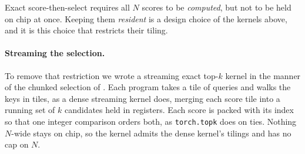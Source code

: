 Exact score-then-select requires all $N$ scores to be \emph{computed}, but not
to be held on chip at once. Keeping them \emph{resident} is a design choice of
the kernels above, and it is this choice that restricts their tiling.

\begin{table}[t]
\centering\small
\caption{A streaming exact top-$k$ kernel, which walks the keys in tiles and
keeps a running candidate set per query instead of the score row: latency
divided by the best dense implementation (ratios of minima under CUDA-graph
replay, fp32, batch $256$), beside the resident-row kernel at four retained
peers. The streaming kernel retains exactly the peers \texttt{torch.topk} does
in every one of
\StreamRowsM{} million query rows checked. The last column is the share of the
streaming kernel's time not accounted for by attending over the set, across
$k$, as in Table~\ref{tab:fixedset}. Rows at $1024$ agents are beyond the
resident kernels' cap. The median of the per-repetition paired ratios is within
$13\%$ of the ratio of minima, with a $95\%$ bootstrap interval within
$\pm3.7\%$, and every one- and two-peer entry is below one under either
statistic.}
\label{tab:streaming}

\end{table}

\paragraph{Streaming the selection.} To remove that restriction we wrote a
streaming exact top-$k$ kernel in the manner of the chunked selection of
\citet{gupta2021topk}. Each program takes a tile of queries and walks the keys
in tiles, as a dense streaming kernel does, merging each score tile into a
running set of $k$ candidates held in registers. Each score is packed with its
index so that one integer comparison orders both, as \texttt{torch.topk} does on
ties. Nothing $N$-wide stays on chip, so the kernel admits the dense kernel's
tilings and has no cap on $N$.

